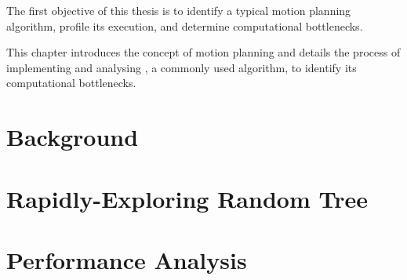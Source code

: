 
The first objective of this thesis is to identify a typical motion planning algorithm, profile its execution, and determine computational bottlenecks.

This chapter introduces the concept of motion planning and details the process of implementing and analysing , a commonly used algorithm, to identify its computational bottlenecks.\\

\section{Background} 
\label{section:motion_planning_background}
    

\newpage
\section{Rapidly-Exploring Random Tree}
\label{section:rrt}
    

\newpage
\section{Performance Analysis}
\label{section:rrt_analysis}
    